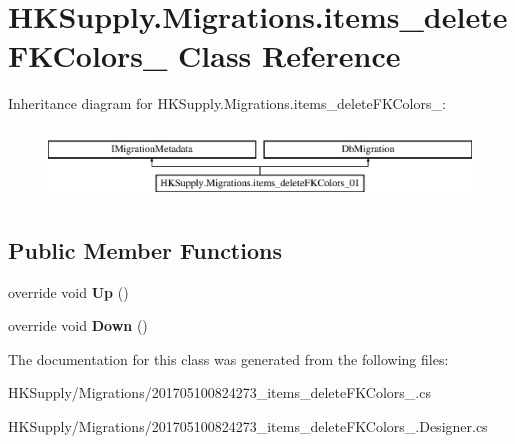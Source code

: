 \hypertarget{class_h_k_supply_1_1_migrations_1_1items__delete_f_k_colors__01}{}\section{H\+K\+Supply.\+Migrations.\+items\+\_\+delete\+F\+K\+Colors\+\_ Class Reference}
\label{class_h_k_supply_1_1_migrations_1_1items__delete_f_k_colors__01}
Inheritance diagram for H\+K\+Supply.\+Migrations.\+items\+\_\+delete\+F\+K\+Colors\+\_\+:\begin{figure}[H]
\begin{center}
\leavevmode
\includegraphics[height=1.958042cm]{class_h_k_supply_1_1_migrations_1_1items__delete_f_k_colors__01}
\end{center}
\end{figure}
\subsection*{Public Member Functions}
\begin{DoxyCompactItemize}
\item 
\mbox{\label{class_h_k_supply_1_1_migrations_1_1items__delete_f_k_colors__01_afb31f7c17afe71a704389ef5f420e1cf}} 
override void {\bfseries Up} ()
\item 
\mbox{\label{class_h_k_supply_1_1_migrations_1_1items__delete_f_k_colors__01_a49851d0020d2b83a670a3691efa71fff}} 
override void {\bfseries Down} ()
\end{DoxyCompactItemize}


The documentation for this class was generated from the following files\+:\begin{DoxyCompactItemize}
\item 
H\+K\+Supply/\+Migrations/201705100824273\+\_\+items\+\_\+delete\+F\+K\+Colors\+\_.\+cs\item 
H\+K\+Supply/\+Migrations/201705100824273\+\_\+items\+\_\+delete\+F\+K\+Colors\+\_.\+Designer.\+cs\end{DoxyCompactItemize}
